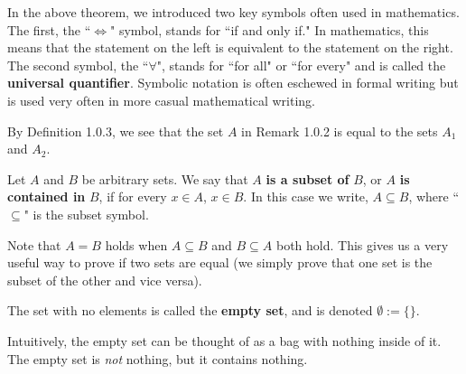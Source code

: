 In the above theorem, we introduced two key symbols often used in mathematics. The first, the ``$\iff$" symbol, stands for ``if and only if." In mathematics, this means that the statement on the left is equivalent to the statement on the right. The second symbol, the  ``$\forall$", stands for ``for all" or ``for every" and is called the \textbf{universal quantifier}. Symbolic notation is often eschewed in formal writing but is used very often in more casual mathematical writing.

\vspace{0.2cm}

\begin{remark}
  By Definition 1.0.3, we see that the set $A$ in Remark 1.0.2 is equal to the sets $A_1$ and $A_2$. 
\end{remark}

\begin{defbox}
   Let $A$ and $B$ be arbitrary sets. We say that $A$ \textbf{is a subset of} $B$, or $A$ \textbf{is contained in} $B$, if for every $x \in A$, $x \in B$. In this case we write, $A \subseteq B$, where ``$\subseteq$" is the subset symbol\footnotemark[3].
\end{defbox}



\vspace{0.2cm}

\begin{remark} 
   Note that $A = B$ holds when $A \subseteq B$ and $B \subseteq A$ both hold. This gives us a very useful way to prove if two sets are equal (we simply prove that one set is the subset of the other and vice versa). 
\end{remark}

\begin{defbox}
   The set with no elements is called the \textbf{empty set}, and is denoted $\emptyset := \{\}$.
\end{defbox}

Intuitively, the empty set can be thought of as a bag with nothing inside of it. The empty set is \textit{not} nothing, but it contains nothing.

